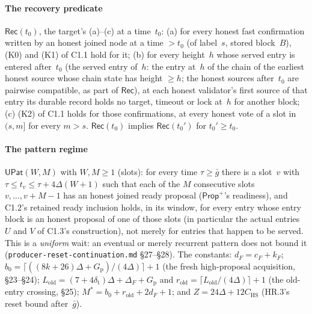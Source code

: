 \documentclass{article}
\newcommand{\cF}{c_F}
\begin{document}
\paragraph{The recovery predicate} $\mathsf{Rec}(t_0)$, the target's (a)--(c)
at a time~$t_0$: (a) for every honest fast confirmation written by an honest
joined node at a time $>t_0$ (of label~$s$, stored block~$B$),
(K0) and (K1) of C1.1 hold for it; (b) for every height~$h$ whose served entry
is entered after~$t_0$ (the served entry of~$h$: the entry at~$h$ of the chain
of the earliest honest source whose chain state has height
$\geq h$; the honest sources after~$t_0$ are pairwise compatible, as part of
$\mathsf{Rec}$), at each honest validator's first source of that entry its
durable record holds no target, timeout or lock at~$h$ for another block;
(c) (K2) of C1.1 holds for those confirmations, at every honest vote of a slot
in $(s,m]$ for every $m>s$.  $\mathsf{Rec}(t_0)$ implies
$\mathsf{Rec}(t_0')$ for $t_0'\geq t_0$.

\paragraph{The pattern regime} $\mathsf{UPat}(W,M)$ with $W,M\geq1$ (slots):
for every time $\tau\geq\bar g$ there is a slot~$v$ with
$\tau\leq t_v\leq\tau+4\Delta(W+1)$ such that each of the $M$ consecutive
slots $v,\dots,v+M-1$ has an honest joined ready proposal
($\mathsf{Prop}^{+}$'s readiness), and C1.2's retained ready inclusion holds,
in its window, for every entry whose entry block is an honest proposal of one
of those slots (in particular the actual entries $U$ and $V$ of C1.3's
construction), not merely for entries that happen to be served.  This is a \emph{uniform} wait: an eventual
or merely recurrent pattern does not bound it (\texttt{producer-reset-continuation.md}
\S27--\S28).  The constants: $d_F=\cF+k_F$;
$b_0=\lceil((8k+26)\Delta+G_{\mathrm p})/(4\Delta)\rceil+1$ (the fresh
high-proposal acquisition, \S23--\S24);
$L_{\mathrm{old}}=(7+4\delta_{\mathrm t})\Delta+\Delta_F+G_{\mathrm p}$ and
$r_{\mathrm{old}}=\lceil L_{\mathrm{old}}/(4\Delta)\rceil+1$ (the old-entry
crossing, \S25); $M^*=b_0+r_{\mathrm{old}}+2d_F+1$; and
$Z=24\Delta+12C_{\mathrm{HS}}$ (HR.3's reset bound after~$\bar g$).
\end{document}
